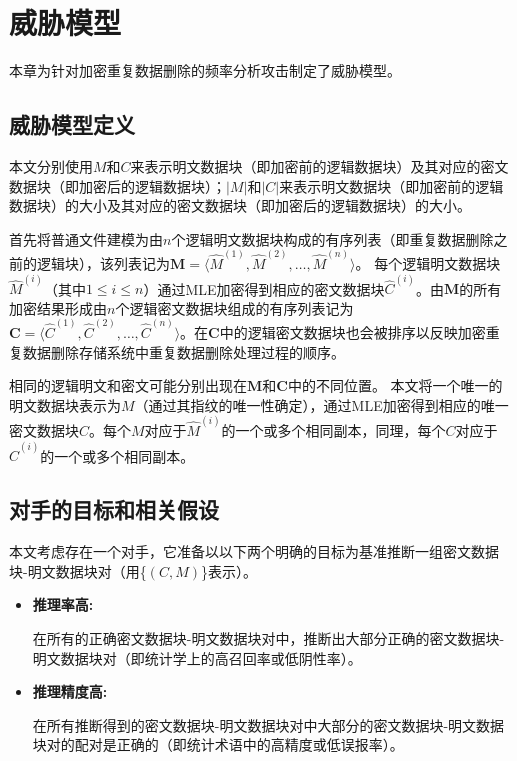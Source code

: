\chapter{威胁模型}
\label{sec:ThreatModel}
本章为针对加密重复数据删除的频率分析攻击制定了威胁模型。

\section{威胁模型定义}
\label{sec:ThreatModel-Definitions}

本文分别使用$M$和$C$来表示明文数据块（即加密前的逻辑数据块）及其对应的密文数据块（即加密后的逻辑数据块）；$|M|$和$|C|$来表示明文数据块（即加密前的逻辑数据块）的大小及其对应的密文数据块（即加密后的逻辑数据块）的大小。

首先将普通文件建模为由$n$个逻辑明文数据块构成的有序列表（即重复数据删除之前的逻辑块），该列表记为$\mathbf{M} = \langle \hat{M}^{(1)}, \hat{M}^{(2)}, \ldots, \hat{M}^{(n)}\rangle$。 每个逻辑明文数据块$\hat{M}^{(i)}$（其中$1\le i\le n$）通过MLE加密得到相应的密文数据块$\hat{C}^{(i)}$。由$\mathbf{M}$的所有加密结果形成由$n$个逻辑密文数据块组成的有序列表记为$\mathbf{C} = \langle \hat{C}^{(1)}, \hat{C}^{(2)}, \ldots, \hat{C}^{(n)} \rangle$。在$\mathbf{C}$中的逻辑密文数据块也会被排序以反映加密重复数据删除存储系统中重复数据删除处理过程的顺序。

相同的逻辑明文和密文可能分别出现在$\mathbf{M}$和$\mathbf{C}$中的不同位置。 本文将一个唯一的明文数据块表示为$M$（通过其指纹的唯一性确定），通过MLE加密得到相应的唯一密文数据块$C$。每个$M$对应于$\hat{M}^{(i)}$的一个或多个相同副本，同理，每个$C$对应于$\hat{C}^{(i)}$的一个或多个相同副本。


\section{对手的目标和相关假设}
\label{sec:ThreatModel-Assumptions}

本文考虑存在一个对手，它准备以以下两个明确的目标为基准推断一组密文数据块-明文数据块对（用\{$(C, M)$\}表示）。


\begin{itemize}
    \item \textbf{推理率高:} 
    
    在所有的正确密文数据块-明文数据块对中，推断出大部分正确的密文数据块-明文数据块对（即统计学上的高召回率或低阴性率）。

    \item \textbf{推理精度高:} 
    
    在所有推断得到的密文数据块-明文数据块对中大部分的密文数据块-明文数据块对的配对是正确的（即统计术语中的高精度或低误报率）。
\end{itemize}
  
